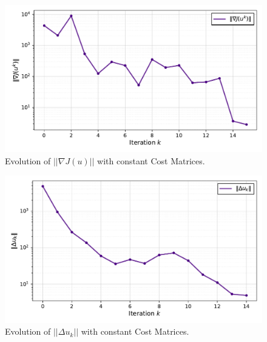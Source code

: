 \begin{figure}[htb]
    \centering
    \includegraphics[width=1\linewidth]{img/1-Task1/NormJ_const.pdf}
    \caption{Evolution of $||\nabla J(u)||$ with constant Cost Matrices.}
    \label{fig:NormJ_const}
\end{figure}

\begin{figure}[htb]
    \centering
    \includegraphics[width=1\linewidth]{img/1-Task1/normdu_const.pdf}
    \caption{Evolution of $||\Delta u_k||$ with constant Cost Matrices.}
    \label{fig:normdu_const}
\end{figure}





